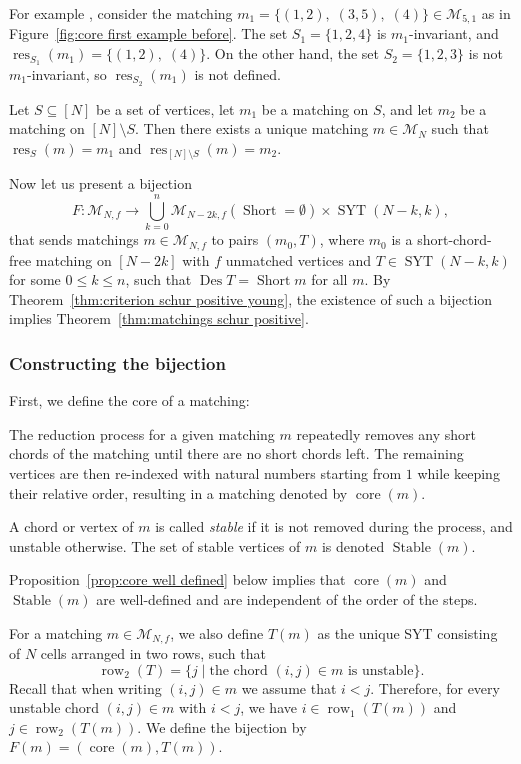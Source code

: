 \documentclass[ALCO]{cedram}
\newcommand{\Des}{\operatorname{Des}}
\newcommand{\Syt}{\operatorname{SYT}}
\newcommand{\Short}{\operatorname{Short}}
\newcommand{\Stable}{\operatorname{Stable}}
\newcommand{\core}{\operatorname{core}}
\newcommand{\res}{\operatorname{res}}
\newcommand{\row}{\operatorname{row}}
\newcommand{\M}{\mathcal{M}}
\begin{document}
For example , consider the matching $m_1 = \{(1,2),\; (3,5),\; (4)\} \in \M_{5,1}$ as in Figure~\ref{fig:core first example before}. The set $S_1=\{1,2,4\}$ is $m_1$-invariant, and $\res_{S_1}(m_1)=\{(1,2),\; (4)\}$. On the other hand, the set $S_2 = \{1,2,3\}$ is not $m_1$-invariant, so $\res_{S_2}(m_1)$ is not defined.


\begin{observation}
\label{obs:restriction of matching to set and complement defines uniquely}
    Let $S \subseteq [N]$ be a set of vertices, let $m_1$ be a matching on $S$, and let $m_2$ be a matching on $[N]\setminus S$. Then there exists a unique matching $m \in \M_N$ such that $\res_S(m) = m_1$ and $\res_{[N] \setminus S}(m) = m_2$.
\end{observation}


Now let us present a bijection
\[
    F:\M_{N,f} \to \bigcup_{k=0}^n \M_{N-2k,f}(\Short = \emptyset) \times \Syt(N-k,k),
\]
that sends matchings $m \in \M_{N,f}$ to pairs $(m_0,T)$, where $m_0$ is a short-chord-free matching on $[N-2k]$ with $f$ unmatched vertices and $T\in \Syt(N-k,k)$ for some $0\le k \le n$, such that
$\Des T = \Short m$ for all $m$. By Theorem~\ref{thm:criterion schur positive young}, the existence of such a bijection implies Theorem~\ref{thm:matchings schur positive}.

\subsubsection{Constructing the bijection}
\label{subsec:constructing the bijection}
First, we define the core of a matching:
\begin{definition}
\label{def:core of matching}
    The reduction process for a given matching $m$ repeatedly removes any short chords of the matching until there are no short chords left. The remaining vertices are then re-indexed with natural numbers starting from $1$ while keeping their relative order, resulting in a matching denoted by $\core(m)$.
    
    A chord or vertex of $m$ is called \emph{stable} if it is not removed during the process, and unstable otherwise.
    The set of stable vertices of $m$ is denoted $\Stable(m)$.
\end{definition}

Proposition~\ref{prop:core well defined} below implies that $\core(m)$ and $\Stable(m)$ are well-defined and are independent of the order of the steps.

For a matching $m \in \M_{N,f}$, we also define $T(m)$ as the unique SYT consisting of $N$ cells arranged in two rows, such that
\[
    \row_2(T) = \{j \mid \text{the chord } (i,j) \in m \text{ is unstable}\}.
\]
Recall that when writing $(i,j) \in m$ we assume that $i<j$. Therefore, for every unstable chord $(i,j)\in m$ with $i<j$, we have $i \in \row_1(T(m))$ and $j \in \row_2(T(m))$. We define the bijection by $F(m) = (\core(m),T(m))$.
\end{document}
